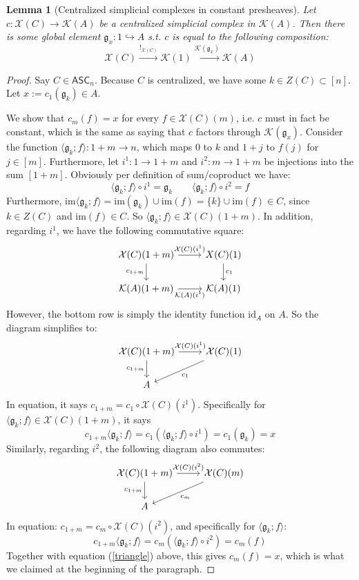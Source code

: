 \documentclass{article}
\newtheorem{lemma}{Lemma}[subsection]
\theoremstyle{remark}
\theoremstyle{definition}
\newcommand{\ASC}{\mathsf{ASC}}
\newcommand{\im}{\mathrm{im}}
\newcommand{\id}{\mathrm{id}}
\newcommand{\X}{\mathcal X}
\newcommand{\K}{\mathcal K}
\newcommand{\g}{\mathfrak g}
\begin{document}
	\begin{lemma}[Centralized simplicial complexes in constant presheaves]\label{scompK}
		Let $c:\X(C)\to\K(A)$ be a centralized simplicial complex in $\K(A)$. Then there is some global element $\g_x:1\hookrightarrow A$ s.t. $c$ is equal to the following composition:
		\[\X(C)\xrightarrow{!_{\X(C)}}\K(1)\xrightarrow{\K(\g_x)}\K(A)\]
	\end{lemma}
	\begin{proof}
		Say $C\in\ASC_n$. Because $C$ is centralized, we have some $k\in Z(C)\subset[n]$. Let $x:=c_1(\g_k)\in A$.
		
		We show that $c_m(f)=x$ for every $f\in\X(C)(m)$, i.e. $c$ must in fact be constant, which is the same as saying that $c$ factors through $\K(\g_x)$. Consider the function $\langle\g_k;f\rangle:1+m\to n$, which maps 0 to $k$ and $1+j$ to $f(j)$ for $j\in[m]$. Furthermore, let $i^1:1\to1+m$ and $i^2:m\to1+m$ be injections into the sum $[1+m]$. Obviously per definition of sum/coproduct we have:
		\[\langle\g_k;f\rangle\circ i^1=\g_k\qquad\langle\g_k;f\rangle\circ i^2=f\]
		Furthermore, $\im\langle\g_k;f\rangle=\im(\g_k)\cup\im(f)=\{k\}\cup\im(f)\in C$, since $k\in Z(C)$ and $\im(f)\in C$. So $\langle\g_k;f\rangle\in\X(C)(1+m)$. In addition, regarding $i^1$, we have the following commutative square:
		\[\begin{tikzcd}
			\X(C)(1+m)\arrow{r}{\X(C)(i^1)}\arrow{d}[swap]{c_{1+m}}&X(C)(1)\arrow{d}{c_1}\\
			\K(A)(1+m)\arrow{r}[swap]{\K(A)(i^1)}&\K(A)(1)
		\end{tikzcd}\]
		However, the bottom row is simply the identity function $\id_A$ on $A$. So the diagram simplifies to:
		\[\begin{tikzcd}
			\X(C)(1+m)\arrow{r}{\X(C)(i^1)}\arrow{d}[swap]{c_{1+m}}&\X(C)(1)\arrow{dl}{c_1}\\
			A
		\end{tikzcd}\]
		In equation, it says $c_{1+m}=c_1\circ\X(C)(i^1)$. Specifically for $\langle\g_k;f\rangle\in\X(C)(1+m)$, it says
		\begin{equation}\label{triangle}
			c_{1+m}\langle\g_k;f\rangle=c_1(\langle\g_k;f\rangle\circ i^1)=c_1(\g_k)=x
		\end{equation}
		Similarly, regarding $i^2$, the following diagram also commutes:
		\[\begin{tikzcd}
			\X(C)(1+m)\arrow{r}{\X(C)(i^2)}\arrow{d}[swap]{c_{1+m}}&\X(C)(m)\arrow{dl}{c_m}\\
			A
		\end{tikzcd}\]
		In equation: $c_{1+m}=c_m\circ\X(C)(i^2)$, and specifically for $\langle\g_k;f\rangle$:
		\[c_{1+m}\langle\g_k;f\rangle=c_m(\langle\g_k;f\rangle\circ i^2)=c_m(f)\]
		Together with equation (\ref{triangle}) above, this gives $c_m(f)=x$, which is what we claimed at the beginning of the paragraph.
	\end{proof}
\end{document}
